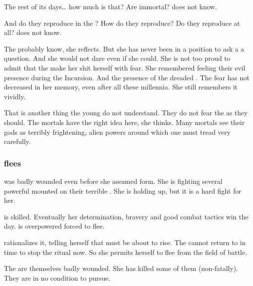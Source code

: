 The rest of its days\ldots{} how much is that? 
Are \umbrae{} immortal? 
\Achsah{} does not know. 

And do they reproduce in the \Wylde{}?
How do they reproduce? 
Do they reproduce at all? 
\Achsah{} does not know. 

The \banelords{} probably know, she reflects. 
But she has never been in a position to ask a \banelord{} a question. 
And she would not dare even if she could. 
She is not too proud to admit that the \banelords{} make her shit herself with fear. 
She remembered feeling their evil presence during the Incursion. 
And the presence of the dreaded \Voidbringer. 
The fear has not decreased in her memory, even after all these millennia. 
She still remembers it vividly. 

That is another thing the young \resphain{} do not understand. 
They do not fear the \banes{} as they should. 
The mortals have the right idea here, she thinks. 
Many mortals see their gods as terribly frightening, alien powers around which one must tread very carefully.

\begin{prose}
\end{prose}





\subsubsection{\Nzessuacrith flees}
\Nzessuacrith was badly wounded even before she assumed \draconian form.
She is fighting several powerful \resphain mounted on their terrible \umbrae. 
She is holding up, but it is a hard fight for her. 

\Achsah is skilled. 
Eventually her determination, bravery and good combat tactics win the day. 
\Nzessuacrith is overpowered forced to flee. 

\Nzessuacrith rationalizes it, telling herself that \Nithdornazsh must be about to rise. 
The \resphain cannot return to \Malcur in time to stop the ritual now. 
So she permits herself to flee from the field of battle. 

The \resphain are themselves badly wounded.
She has killed some of them (non-fatally).
They are in no condition to pursue. 






